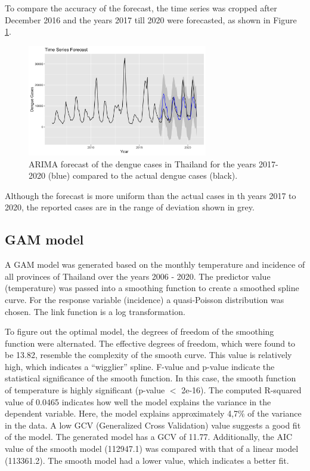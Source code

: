 	To compare the accuracy of the forecast, the time series was cropped after December 2016 and the years 2017 till 2020 were forecasted, as shown in Figure \ref{fig:Auto_ARIMA_2016}. 
		\begin{figure}[hbpt] 
		\centering
		\includegraphics[width=0.7\textwidth]{fig/Auto_ARIMA_2016.png}
		\caption{ARIMA forecast of the dengue cases in Thailand for the years 2017-2020 (blue) compared to the actual dengue cases (black).}
		\label{fig:Auto_ARIMA_2016}
	\end{figure}

Although the forecast is more uniform than the actual cases in th years 2017 to 2020, the reported cases are in the range of deviation shown in grey. 

\subsection{GAM model}
A GAM model was generated based on the monthly temperature and incidence of all provinces of Thailand over the years 2006 - 2020. The predictor value (temperature) was passed into a smoothing function to create a smoothed spline curve. For the response variable (incidence) a quasi-Poisson distribution was chosen. The link function is a log transformation.

To figure out the optimal model, the degrees of freedom of the smoothing function were alternated. The effective degrees of freedom, which were found to be 13.82, resemble the complexity of the smooth curve. This value is relatively high, which indicates a “wigglier” spline. F-value and p-value indicate the statistical significance of the smooth function. In this case, the smooth function of temperature is highly significant (p-value $<$ 2e-16). The computed R-squared value of 0.0465 indicates how well the model explains the variance in the dependent variable. Here, the model explains approximately 4,7\% of the variance in the data. A low GCV (Generalized Cross Validation) value suggests a good fit of the model. The generated model has a GCV of 11.77. Additionally, the AIC value of the smooth model (112947.1) was compared with that of a linear model (113361.2). The smooth model had a lower value, which indicates a better fit.


